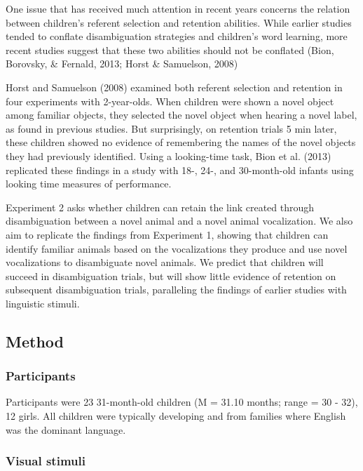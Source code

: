 \documentclass[english,floatsintext,man]{apa6}
\theoremstyle{definition}
\theoremstyle{definition}
\theoremstyle{definition}
\theoremstyle{remark}
\begin{document}
One issue that has received much attention in recent years concerns the
relation between children's referent selection and retention abilities.
While earlier studies tended to conflate disambiguation strategies and
children's word learning, more recent studies suggest that these two
abilities should not be conflated (Bion, Borovsky, \& Fernald, 2013;
Horst \& Samuelson, 2008)

Horst and Samuelson (2008) examined both referent selection and
retention in four experiments with 2-year-olds. When children were shown
a novel object among familiar objects, they selected the novel object
when hearing a novel label, as found in previous studies. But
surprisingly, on retention trials 5 min later, these children showed no
evidence of remembering the names of the novel objects they had
previously identified. Using a looking-time task, Bion et al. (2013)
replicated these findings in a study with 18-, 24-, and 30-month-old
infants using looking time measures of performance.

Experiment 2 asks whether children can retain the link created through
disambiguation between a novel animal and a novel animal vocalization.
We also aim to replicate the findings from Experiment 1, showing that
children can identify familiar animals based on the vocalizations they
produce and use novel vocalizations to disambiguate novel animals. We
predict that children will succeed in disambiguation trials, but will
show little evidence of retention on subsequent disambiguation trials,
paralleling the findings of earlier studies with linguistic stimuli.

\hypertarget{method-1}{%
\subsection{Method}\label{method-1}}

\hypertarget{participants-1}{%
\subsubsection{Participants}\label{participants-1}}

Participants were 23 31-month-old children (M = 31.10 months; range = 30
- 32), 12 girls. All children were typically developing and from
families where English was the dominant language.

\hypertarget{visual-stimuli-1}{%
\subsubsection{Visual stimuli}\label{visual-stimuli-1}}
\end{document}
